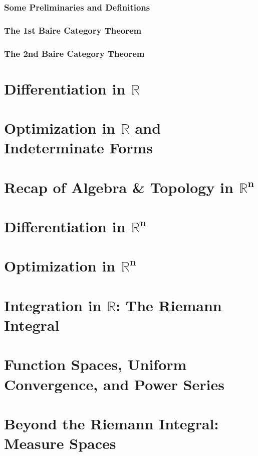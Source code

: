 \subsection{Some Preliminaries and Definitions}
\subsection{The 1st Baire Category Theorem}
\subsection{The 2nd Baire Category Theorem}
\chapter{Differentiation in \texorpdfstring{$\pmb{\mathbb{R}}$}{R}}
\chapter{Optimization in \texorpdfstring{$\pmb{\mathbb{R}}$}{R} and Indeterminate Forms}
\chapter{Recap of Algebra \& Topology in \texorpdfstring{$\pmb{\mathbb{R}^n}$}{Rn}}
\section{}
\chapter{Differentiation in \texorpdfstring{$\pmb{\mathbb{R}^n}$}{Rn}}
\chapter{Optimization in \texorpdfstring{$\pmb{\mathbb{R}^n}$}{Rn}}
\chapter{Integration in \texorpdfstring{$\pmb{\mathbb{R}}$}{R}: The Riemann Integral}
\chapter{Function Spaces, Uniform Convergence, and Power Series}
\chapter{Beyond the Riemann Integral: Measure Spaces}
